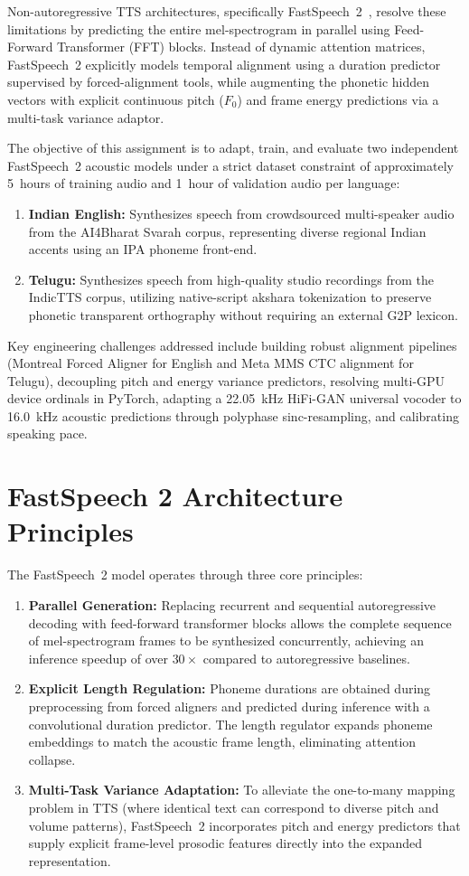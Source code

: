 \documentclass[11pt,a4paper]{report}
\begin{document}
Non-autoregressive TTS architectures, specifically FastSpeech~2~\cite{fastspeech2}, resolve these limitations by predicting the entire mel-spectrogram in parallel using Feed-Forward Transformer (FFT) blocks. Instead of dynamic attention matrices, FastSpeech~2 explicitly models temporal alignment using a duration predictor supervised by forced-alignment tools, while augmenting the phonetic hidden vectors with explicit continuous pitch ($F_0$) and frame energy predictions via a multi-task variance adaptor.

The objective of this assignment is to adapt, train, and evaluate two independent FastSpeech~2 acoustic models under a strict dataset constraint of approximately 5~hours of training audio and 1~hour of validation audio per language:
\begin{enumerate}
    \item \textbf{Indian English:} Synthesizes speech from crowdsourced multi-speaker audio from the AI4Bharat Svarah corpus, representing diverse regional Indian accents using an IPA phoneme front-end.
    \item \textbf{Telugu:} Synthesizes speech from high-quality studio recordings from the IndicTTS corpus, utilizing native-script akshara tokenization to preserve phonetic transparent orthography without requiring an external G2P lexicon.
\end{enumerate}

Key engineering challenges addressed include building robust alignment pipelines (Montreal Forced Aligner for English and Meta MMS CTC alignment for Telugu), decoupling pitch and energy variance predictors, resolving multi-GPU device ordinals in PyTorch, adapting a 22.05~kHz HiFi-GAN universal vocoder to 16.0~kHz acoustic predictions through polyphase sinc-resampling, and calibrating speaking pace.

\section{FastSpeech 2 Architecture Principles}
The FastSpeech~2 model operates through three core principles:
\begin{enumerate}
    \item \textbf{Parallel Generation:} Replacing recurrent and sequential autoregressive decoding with feed-forward transformer blocks allows the complete sequence of mel-spectrogram frames to be synthesized concurrently, achieving an inference speedup of over $30\times$ compared to autoregressive baselines.
    \item \textbf{Explicit Length Regulation:} Phoneme durations are obtained during preprocessing from forced aligners and predicted during inference with a convolutional duration predictor. The length regulator expands phoneme embeddings to match the acoustic frame length, eliminating attention collapse.
    \item \textbf{Multi-Task Variance Adaptation:} To alleviate the one-to-many mapping problem in TTS (where identical text can correspond to diverse pitch and volume patterns), FastSpeech~2 incorporates pitch and energy predictors that supply explicit frame-level prosodic features directly into the expanded representation.
\end{enumerate}
\end{document}
